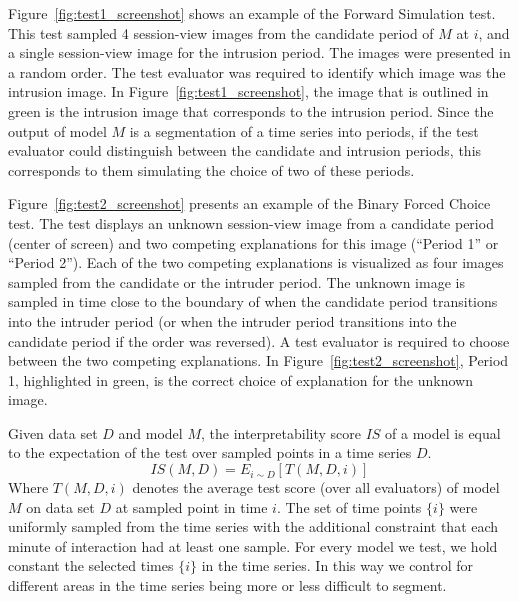 \documentclass[letterpaper]{article} %
\newcommand{\kibitz}[2]{\ifnum\Comments=1{\textcolor{#1}{#2}}\fi}
\newcommand{\nh}[1]{\kibitz{blue}{[NH:#1]}}
\begin{document}
Figure~\ref{fig:test1_screenshot} shows an example of the Forward Simulation test.
This test sampled 4 session-view images from the candidate period of $M$ at $i$, and a single session-view image for the intrusion period. 
The images were presented in a random order.
The test evaluator was required to identify which image was the intrusion image. 
In Figure~\ref{fig:test1_screenshot}, the image that is outlined in green is the intrusion image that corresponds to the intrusion period.
Since the output of model $M$ is a segmentation of a time series into periods, if the test evaluator could distinguish between the candidate and intrusion periods, this corresponds to them simulating the choice of two of these periods.


Figure~\ref{fig:test2_screenshot} presents an example of the Binary Forced Choice test. 
The test displays an unknown session-view image from a candidate period (center of screen) and two competing explanations for this image (``Period 1'' or ``Period 2''). 
Each of the  two competing explanations is visualized as four images sampled from the candidate or the intruder period.
The unknown image is sampled in time close to the boundary of when the candidate period transitions into the intruder period (or when the intruder period transitions into the candidate period if the order was reversed).
A test evaluator is required to choose between the two competing explanations.
In Figure~\ref{fig:test2_screenshot}, Period 1, highlighted in green, is the correct choice of explanation for the unknown image.


Given data set $D$ and model $M$, the interpretability score $IS$ of a model is equal to the expectation   of the test over sampled points in a time series $D$.
\begin{equation}
    \label{eq:interpretability_score_eq}
     IS(M,D) = E_{i\sim D} [ T (M,D,i)]  
\end{equation}
Where $T(M,D,i)$  denotes the average test score (over all evaluators) of model $M$ on data set $D$ at sampled point in time $i$. The set of time points $\{i\}$ were uniformly sampled from the time series with the additional constraint that each minute of interaction had at least one sample.
For every model we test, we hold constant the selected times $\{i\}$ in the time series. In this way we  control for different areas in the time series being more or less difficult to segment.
\end{document}
